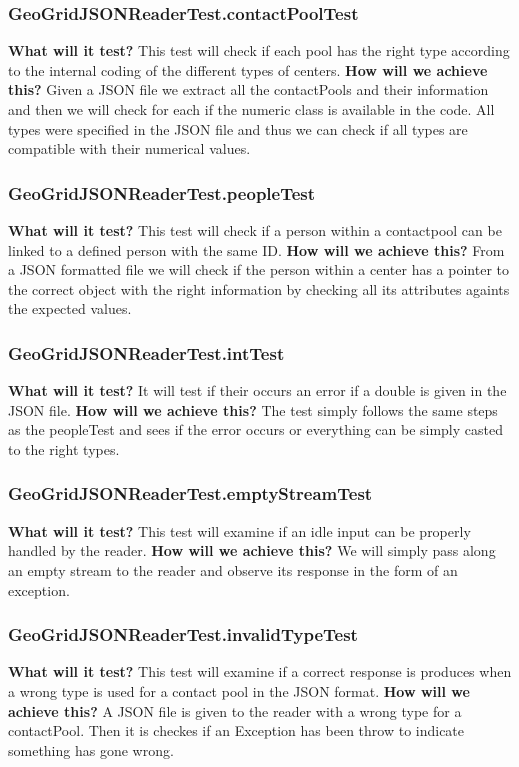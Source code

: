 \documentclass{article}
\begin{document}
\subsubsection{GeoGridJSONReaderTest.contactPoolTest}
\textbf{What will it test?}
This test will check if each pool has the right type according to the internal coding of the different types of centers.
\newline
\textbf{How will we achieve this?}
Given a JSON file we extract all the contactPools and their information and then we will check for each if the numeric class is available in the code. All types were specified in the JSON file and thus we can check if all types are compatible with their numerical values.

\subsubsection{GeoGridJSONReaderTest.peopleTest}
\textbf{What will it test?}
This test will check if a person within a contactpool can be linked to a defined person with the same ID.
\newline
\textbf{How will we achieve this?}
From a JSON formatted file we will check if the person within a center has a pointer to the correct object with the right information by checking all its attributes againts the expected values.

\subsubsection{GeoGridJSONReaderTest.intTest}
\textbf{What will it test?}
It will test if their occurs an error if a double is given in the JSON file.
\newline
\textbf{How will we achieve this?}
The test simply follows the same steps as the peopleTest and sees if the error occurs or everything can be simply casted to the right types.

\subsubsection{GeoGridJSONReaderTest.emptyStreamTest}
\textbf{What will it test?}
This test will examine if an idle input can be properly handled by the reader.
\newline
\textbf{How will we achieve this?}
We will simply pass along an empty stream to the reader and observe its response in the form of an exception.

\subsubsection{GeoGridJSONReaderTest.invalidTypeTest}
\textbf{What will it test?}
This test will examine if a correct response is produces when a wrong type is used for a contact pool in the JSON format.
\newline
\textbf{How will we achieve this?}
A JSON file is given to the reader with a wrong type for a contactPool. Then it is checkes if an Exception has been throw to indicate something has gone wrong.
\end{document}
